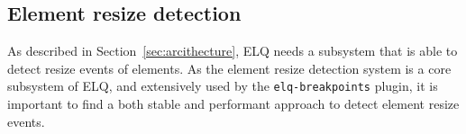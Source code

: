 \documentclass[a4paper,11pt]{kth-mag}
\newcommand{\code}[1]{\texttt{#1}}
\begin{document}
      \subsection{Element resize detection}\label{sec:imp_erd}
        As described in Section~\ref{sec:arcithecture}, \gls{ELQ} needs a subsystem that is able to detect resize events of elements.
        As the element resize detection system is a core subsystem of \gls{ELQ}, and extensively used by the \code{elq-breakpoints} plugin, it is important to find a both stable and performant approach to detect element resize events.
\end{document}
